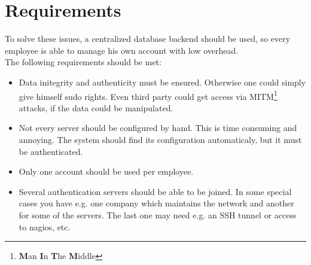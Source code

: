 %
%
%
%
%
%
%


\section{Requirements}

To solve these issues, a centralized database backend should be used, so every
employee is able to manage his own account with low overhead. \\

The following requirements should be met:

\begin{itemize}
	\item Data initegrity and authenticity must be ensured. Otherwise one could
		simply give himself sudo rights. Even third party could get access via
		MITM\footnote{\textbf{M}an \textbf{I}n \textbf{T}he \textbf{M}iddle}
		attacks, if the data could be manipulated.
	\item Not every server should be configured by hand. This is time consuming
		and annoying. The system should find its configuration automaticaly, but
		it must be authenticated.
	\item Only one account should be used per employee.
	\item Several authentication servers should be able to be joined. In some
		special cases you have e.g. one company which maintains the network and
		another for some of the servers. The last one may need e.g. an SSH
		tunnel or access to nagios, etc.
\end{itemize}
